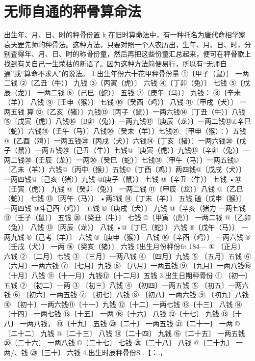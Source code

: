 {{\section{无师自通的秤骨算命法}
出生年、月、日、时的秤骨份置	k
在旧时算命法中，有一种托名为唐代命相学家袁天罡先师的秤骨法。这种方法，只要对照一个人农历出，生年、月、日、时，分别査得年、月、日、时的称骨份童，然后再把这些份童汇总起来，便可在秤骨歌上找到有关自己一生荣枯的断语了。因为这种方法简便易行，所以有“无师自通”或“算命不求人”的说法。
1.出生年份六十花甲秤骨份量	
①〔甲子（鼠）〕	一两二钱
②〔乙丑（牛）〕	九钱
③〔丙寅（虎）〕	六钱
④〔丁卯（兔）〕	七钱
⑤〔戊辰（龙）〕	一两二钱
⑥〔己巳（蛇）〕	五钱
⑦〔庚午（马）〕	九钱：
⑧〔辛未（羊）〕	八钱
⑨〔壬申（猴）〕	七钱
⑩〔癸酉（鸡）〕	八钱
⑪〔甲戌（犬）〕	一两五钱
算
⑫〔乙亥（猪）〕九钱⑬〔丙子（鼠）〕一两六钱⑭〔丁丑（牛）〕八钱⑮〔戊寅（虎）〕八钱⑯〔B卯（兔）〕一两九钱⑫〔庚辰（龙）〕一两二钱⑬£辛巳（蛇）〕六钱⑲〔壬午（马）〕八钱⑳〔癸未（羊）〕七钱㉑.〔甲申（猴）：）五钱@〔乙酉（鸡）〕一两五钱⑳〔丙戌（犬）〕六钱⑭〔丁亥（猪）〕一两六钱⑳〔戊子（鼠）〕一两五钱⑳〔己丑（牛）〕七钱@〔庚寅（虎）〕九钱⑬〔辛卯（兔）〕一两二钱⑳〔壬辰（龙）〕一两⑳〔癸巳（蛇）〕七钱㉛〔甲午（马）〕一两五钱©〔乙未（羊）〕六钱@〔丙中（猴）〕五钱©〔丁酉（鸡）〕两四钱@〔戊戌（犬）〕一两四钱@〔己亥（猪）〕九钱
@f庚子（鼠）〕	七钱
@〔辛丑（牛）〕	七钱
•㉝〔壬寅（虎）〕	九钱
@〔癸卯（兔）〕	一两二钱
⑪〔甲辰（龙）〕'	八钱
@〔乙巳（蛇）〕	七钱
⑬〔丙午（马）〕	•两5钱
⑭〔丁未（羊）〕	五钱
磕〔戊申（猴）〕	一两四钱
@斗己酉（鸡）〕	五饯
®〔庚戌（犬）〕	九钱
@〔辛亥（猪力	一两七钱
⑬〔壬子（鼠）〕	五饯
⑳〔癸丑（牛）〕	七钱
©〔甲寅（虎）〕	一两二钱
@〔乙卯（兔）〕	八钱
⑬〔丙辰（龙）〕	八钱
•@〔丁巳（蛇）〕	六钱
®〔戊午（马）〕	一两九钱
®〔己考（羊）〕	六钱
®〔庚申（猴）〕	八钱
⑯〔辛酉（鸡）〕	一两六钱
®〔壬戌（犬）〕	一两
⑯〔癸亥（猪）〕	六钱
I出生月份秤份fit
184—
①	〔正月〕六钱
②	〔二月〕七钱
③	〔三月〕一两八钱
④	〔四月〕九钱
⑤	〔五月〕五钱
⑥	〔六月〕一两六钱
⑦	〔七月〕九钱
⑧	〔八月〕一两五钱
⑨	〔九月〕一两八钱⑯〔十月〕八钱
⑪〔十一月〕九钱⑫〔十二月〕五钱
3.出生日期秤骨份
①	〔初一〕五钱
②	〔初二〕一两
③	〔初三〕八钱
④	〔初四〕一两五钱
⑤	〔初五〕一两六钱
⑥	〔初六〕一两五钱
⑦	〔初七〕八钱
⑧	〔初八〕一两六钱
⑨	〔初九〕八钱
⑩	〔初十〕一两六钱⑪〔十一〕九钱
⑫〔十二〕一两七钱
⑬〔十三〕	八钱
⑭〔十四〕	一两七钱
⑮〔十五〕	一两
⑯〔十六〕	八钱
⑫〔十七〕	九钱
⑬〔十八〕	一两八钱，
⑩〔十九〕	五钱
⑳〔二十〕	一两五钱
㉑〔二十一〕	一两
©〔二十二〕	九钱
@〔二十三〕	八钱
⑭〔二十四〕	九钱
⑮〔二十五〕	一两五钱
⑳〔二十六〕	一两八钱
©〔二十七〕	七钱
⑳〔二十八〕	八钱
@〔二十九〕	一两/、钱
⑳〔三十〕	六钱
4.出生时辰秤骨份S	.【：.，
}}
